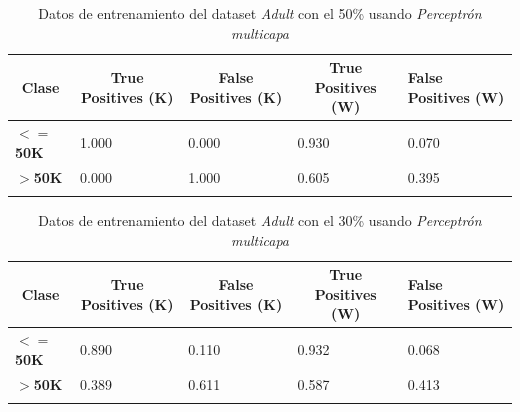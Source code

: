 \documentclass[10pt,a4paper]{article}
\begin{document}
\begin{table}[h]
\begin{tabular}{lllll}
\hline
\multicolumn{1}{|c|}{\textbf{Clase}} & \multicolumn{1}{c|}{\textbf{True Positives (K)}} & \multicolumn{1}{c|}{\textbf{False Positives (K)}} & \multicolumn{1}{c|}{\textbf{True Positives (W)}} & \multicolumn{1}{l|}{\textbf{False Positives (W)}} \\ \hline
\multicolumn{1}{|l|}{\textbf{$<=$50K}} & \multicolumn{1}{l|}{1.000}          & \multicolumn{1}{l|}{0.000}          & \multicolumn{1}{l|}{0.930}          & \multicolumn{1}{l|}{0.070} \\ \hline
\multicolumn{1}{|l|}{\textbf{$>$50K}} & \multicolumn{1}{l|}{0.000}          & \multicolumn{1}{l|}{1.000}          & \multicolumn{1}{l|}{0.605}          & \multicolumn{1}{l|}{0.395} \\ \hline
\textbf{}                       &                                &                                &                                &                      
\end{tabular}
\caption{Datos de entrenamiento del dataset \emph{Adult} con el 50\% usando \emph{Perceptrón multicapa}}
\label{tab:adult_perceptron_50}
\end{table}

\begin{table}[h]
\begin{tabular}{lllll}
\hline
\multicolumn{1}{|c|}{\textbf{Clase}} & \multicolumn{1}{c|}{\textbf{True Positives (K)}} & \multicolumn{1}{c|}{\textbf{False Positives (K)}} & \multicolumn{1}{c|}{\textbf{True Positives (W)}} & \multicolumn{1}{l|}{\textbf{False Positives (W)}} \\ \hline
\multicolumn{1}{|l|}{\textbf{$<=$50K}} & \multicolumn{1}{l|}{0.890}          & \multicolumn{1}{l|}{0.110}          & \multicolumn{1}{l|}{0.932}          & \multicolumn{1}{l|}{0.068} \\ \hline
\multicolumn{1}{|l|}{\textbf{$>$50K}} & \multicolumn{1}{l|}{0.389}          & \multicolumn{1}{l|}{0.611}          & \multicolumn{1}{l|}{0.587}          & \multicolumn{1}{l|}{0.413} \\ \hline
\textbf{}                       &                                &                                &                                &                      
\end{tabular}
\caption{Datos de entrenamiento del dataset \emph{Adult} con el 30\% usando \emph{Perceptrón multicapa}}
\label{tab:adult_perceptron_30}
\end{table}
\end{document}
